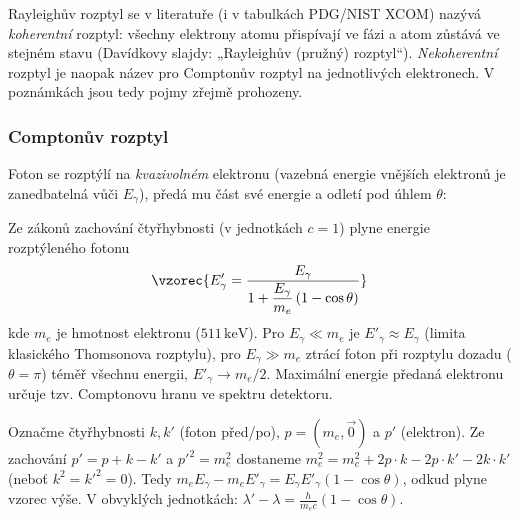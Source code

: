 \begin{vysvetleni}
Rayleighův rozptyl se v literatuře (i v tabulkách PDG/NIST XCOM) nazývá
\emph{koherentní} rozptyl: všechny elektrony atomu přispívají ve fázi
a atom zůstává ve stejném stavu (Davídkovy slajdy: „Rayleighův (pružný)
rozptyl``). \emph{Nekoherentní} rozptyl je naopak název pro Comptonův
rozptyl na jednotlivých elektronech. V poznámkách jsou tedy pojmy zřejmě
prohozeny.
\end{vysvetleni}

\subsubsection{Comptonův rozptyl}
Foton se rozptýlí na \emph{kvazivolném} elektronu (vazebná energie vnějších
elektronů je zanedbatelná vůči \(E_\gamma\)), předá mu část své energie
a odletí pod úhlem \(\theta\):

\begin{center}
\end{center}

Ze zákonů zachování čtyřhybnosti (v jednotkách \(c=1\)) plyne energie
rozptýleného fotonu
\[
  \vzorec{E'_\gamma = \frac{E_\gamma}{1 + \dfrac{E_\gamma}{m_e}\,(1-\cos\theta)}}
\]
kde \(m_e\) je hmotnost elektronu (\(511\,\text{keV}\)). Pro
\(E_\gamma \ll m_e\) je \(E'_\gamma \approx E_\gamma\) (limita klasického
Thomsonova rozptylu), pro \(E_\gamma \gg m_e\) ztrácí foton při rozptylu
dozadu (\(\theta=\pi\)) téměř všechnu energii,
\(E'_\gamma \to m_e/2\). Maximální energie předaná elektronu určuje tzv.
Comptonovu hranu ve spektru detektoru.

\begin{vysvetleni}
Označme čtyřhybnosti \(k, k'\) (foton před/po), \(p=(m_e,\vec 0)\) a \(p'\)
(elektron). Ze zachování \(p' = p + k - k'\) a \(p'^2 = m_e^2\) dostaneme
\(m_e^2 = m_e^2 + 2p\cdot k - 2p\cdot k' - 2k\cdot k'\) (neboť \(k^2=k'^2=0\)).
Tedy \(m_e E_\gamma - m_e E'_\gamma = E_\gamma E'_\gamma(1-\cos\theta)\),
odkud plyne vzorec výše. V obvyklých jednotkách:
\(\lambda' - \lambda = \frac{h}{m_e c}(1-\cos\theta)\).
\end{vysvetleni}


